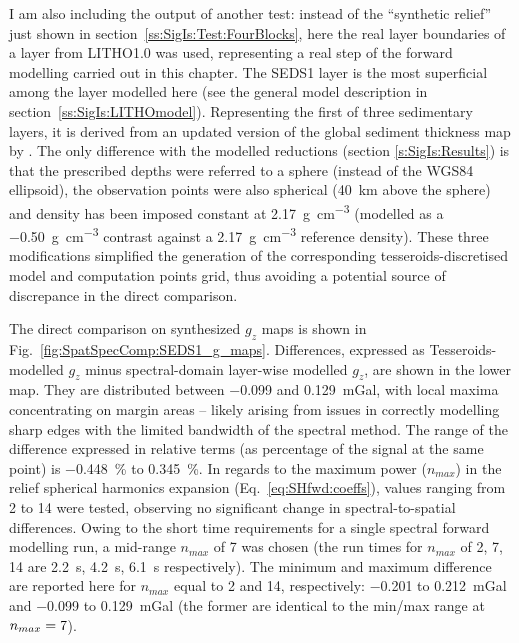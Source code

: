 \begin{subappendices}
I am also including the output of another test: instead of the ``synthetic relief'' just shown in section~\ref{ss:SigIs:Test:FourBlocks}, here the real layer boundaries of a layer from LITHO1.0 \parencite{Pasyanos2014} was used, representing a real step of the forward modelling carried out in this chapter.
The {SEDS1} layer is the most superficial among the layer modelled here (see the general model description in section~\ref{ss:SigIs:LITHOmodel}).
Representing the first of three sedimentary layers, it is derived from an updated version of the global sediment thickness map by \textcite{Laske1997_sediments}.
The only difference with the modelled reductions (section \ref{s:SigIs:Results}) is that the prescribed depths were referred to a sphere (instead of the WGS84 ellipsoid), the observation points were also spherical (\SI{40}{\kilo \metre} above the sphere) and density has been imposed constant at \SI{2.17}{\gram \per \cubic \centi \metre} (modelled as a \SI{-0.50}{\gram \per \cubic \centi \metre} contrast against a \SI{2.17}{\gram \per \cubic \centi \metre} reference density).
These three modifications simplified the generation of the corresponding tesseroids-discretised model and computation points grid, thus avoiding a potential source of discrepance in the direct comparison.

The direct comparison on synthesized $g_z$ maps is shown in Fig.~\ref{fig:SpatSpecComp:SEDS1_g_maps}.
Differences, expressed as Tesseroids-modelled $g_z$ minus spectral-domain layer-wise modelled $g_z$, are shown in the lower map.
They are distributed between \num{-0.099} and \SI{0.129}{\milli Gal}, with local maxima concentrating on margin areas -- likely arising from issues in correctly modelling sharp edges with the limited bandwidth of the spectral method.
The range of the difference expressed in relative terms (as percentage of the signal at the same point) is \SI{-0.448}{\percent} to \SI{0.345}{\percent}.
In regards to the maximum power ($n_{max}$) in the relief spherical harmonics expansion (Eq.~\ref{eq:SHfwd:coeffs}), values ranging from \num{2} to \num{14} were tested, observing no significant change in spectral-to-spatial differences.
Owing to the short time requirements for a single spectral forward modelling run, a mid-range $n_{max}$ of 7 was chosen (the run times for $n_{max}$ of 2, 7, 14 are \SI{2.2}{s}, \SI{4.2}{s}, \SI{6.1}{s} respectively).
The minimum and maximum difference are reported here for $n_{max}$ equal to 2 and 14, respectively: \num{-0.201} to \SI{0.212}{\milli Gal} and \num{-0.099} to \SI{0.129}{\milli Gal} (the former are identical to the min/max range at $n_{max}=\textrm{\num{7}}$).


\end{subappendices}
